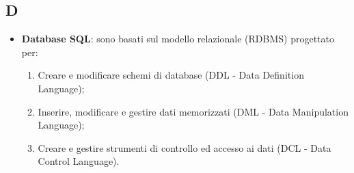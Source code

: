 \subsection{D}

\begin{itemize}
	\item \textbf{Database SQL}: sono basati sul modello relazionale (RDBMS) progettato per:
	\begin{enumerate}  
		\item Creare e modificare schemi di database (DDL - Data Definition Language);
		\item Inserire, modificare e gestire dati memorizzati (DML - Data Manipulation Language);
		\item Creare e gestire strumenti di controllo ed accesso ai dati (DCL - Data Control Language).
	\end{enumerate}
\end{itemize}